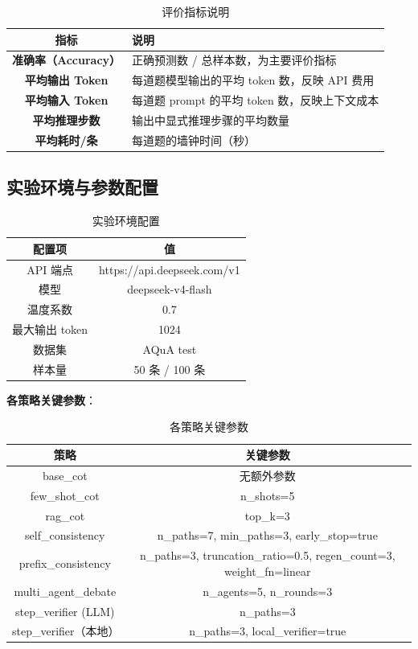 \documentclass[lang=cn,a4paper,newtx]{elegantpaper}
\begin{document}
\begin{table}[htbp]
\centering
\caption{评价指标说明}
\begin{tabular}{cp{10cm}}
\toprule
指标 & 说明 \\
\midrule
\textbf{准确率（Accuracy）} & 正确预测数 / 总样本数，为主要评价指标 \\
\textbf{平均输出 Token} & 每道题模型输出的平均 token 数，反映 API 费用 \\
\textbf{平均输入 Token} & 每道题 prompt 的平均 token 数，反映上下文成本 \\
\textbf{平均推理步数} & 输出中显式推理步骤的平均数量 \\
\textbf{平均耗时/条} & 每道题的墙钟时间（秒） \\
\bottomrule
\end{tabular}
\end{table}

\subsection{实验环境与参数配置}

\begin{table}[htbp]
\centering
\caption{实验环境配置}
\begin{tabular}{cc}
\toprule
配置项 & 值 \\
\midrule
API 端点 & https://api.deepseek.com/v1 \\
模型 & deepseek-v4-flash \\
温度系数 & 0.7 \\
最大输出 token & 1024 \\
数据集 & AQuA test \\
样本量 & 50 条 / 100 条 \\
\bottomrule
\end{tabular}
\end{table}

\textbf{各策略关键参数}：

\begin{table}[htbp]
\centering
\caption{各策略关键参数}
\begin{tabular}{cc}
\toprule
策略 & 关键参数 \\
\midrule
base\_cot & 无额外参数 \\
few\_shot\_cot & n\_shots=5 \\
rag\_cot & top\_k=3 \\
self\_consistency & n\_paths=7, min\_paths=3, early\_stop=true \\
prefix\_consistency & n\_paths=3, truncation\_ratio=0.5, regen\_count=3, weight\_fn=linear \\
multi\_agent\_debate & n\_agents=5, n\_rounds=3 \\
step\_verifier (LLM) & n\_paths=3 \\
step\_verifier（本地） & n\_paths=3, local\_verifier=true \\
\bottomrule
\end{tabular}
\end{table}
\end{document}
